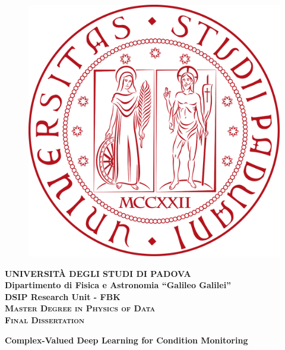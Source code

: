\documentclass[../main.tex]{subfiles}
\begin{document}
	\frontmatter

	\begin{titlepage}
		\vspace{5mm}
		\begin{figure}[hbtp]
			\centering
			\includegraphics[scale=.13]{../pictures/frontespizio/UNIPD}
		\end{figure}
		\vspace{5mm}
		\begin{center}
			{{\huge{\textsc{\bf UNIVERSIT\`A DEGLI STUDI DI PADOVA}}}\\}
			\vspace{5mm}
			{\Large{\bf Dipartimento di Fisica e Astronomia ``Galileo Galilei''}} \\
			\vspace{5mm}
			{\Large{\bf DSIP Research Unit - FBK}} \\
			\vspace{5mm}
			{\Large{\textsc{\bf Master Degree in Physics of Data}}}\\
			\vspace{20mm}
			{\Large{\textsc{\bf Final Dissertation}}}\\
			\vspace{30mm}
			\begin{spacing}{3}
				{\large\textbf{Complex-Valued Deep Learning for Condition Monitoring}}\\
			\end{spacing}
			\vspace{8mm}
		\end{center}
		

\end{titlepage}
\end{document}
